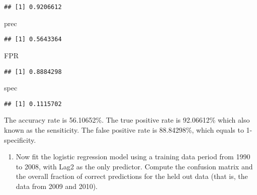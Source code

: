 \documentclass[]{article}
\newenvironment{Shaded}{\begin{snugshade}}{\end{snugshade}}
\newcommand{\KeywordTok}[1]{\textcolor[rgb]{0.13,0.29,0.53}{\textbf{{#1}}}}
\newcommand{\DataTypeTok}[1]{\textcolor[rgb]{0.13,0.29,0.53}{{#1}}}
\newcommand{\DecValTok}[1]{\textcolor[rgb]{0.00,0.00,0.81}{{#1}}}
\newcommand{\StringTok}[1]{\textcolor[rgb]{0.31,0.60,0.02}{{#1}}}
\newcommand{\NormalTok}[1]{{#1}}
\providecommand{\tightlist}{%
  \setlength{\itemsep}{0pt}\setlength{\parskip}{0pt}}
\begin{document}
\begin{verbatim}
## [1] 0.9206612
\end{verbatim}

\begin{Shaded}
\begin{Highlighting}[]
  \NormalTok{prec}
\end{Highlighting}
\end{Shaded}

\begin{verbatim}
## [1] 0.5643364
\end{verbatim}

\begin{Shaded}
\begin{Highlighting}[]
  \NormalTok{FPR}
\end{Highlighting}
\end{Shaded}

\begin{verbatim}
## [1] 0.8884298
\end{verbatim}

\begin{Shaded}
\begin{Highlighting}[]
  \NormalTok{spec}
\end{Highlighting}
\end{Shaded}

\begin{verbatim}
## [1] 0.1115702
\end{verbatim}

The accuracy rate is 56.10652\%. The true positive rate is 92.06612\%
which also known as the sensiticity. The false positive rate is
88.84298\%, which equals to 1-specificity.

\begin{enumerate}
\def\labelenumi{(\alph{enumi})}
\setcounter{enumi}{3}
\tightlist
\item
  Now fit the logistic regression model using a training data period
  from 1990 to 2008, with Lag2 as the only predictor. Compute the
  confusion matrix and the overall fraction of correct predictions for
  the held out data (that is, the data from 2009 and 2010).
\end{enumerate}

\begin{Shaded}
\end{Shaded}
\end{document}
